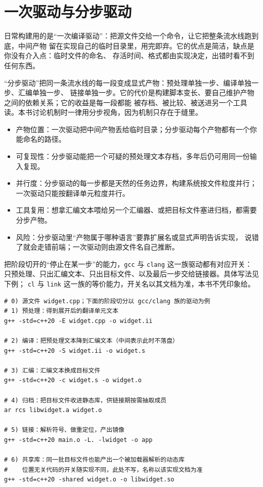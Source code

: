 \documentclass[12pt,a4paper,fontset=fandol]{ctexbook}
\newcommand{\Tool}[1]{\texttt{#1}}
\begin{document}
\section{一次驱动与分步驱动}\label{sec:cl01-drivers}

日常构建用的是“一次编译驱动”：把源文件交给一个命令，让它把整条流水线跑到底，中间产物
留在实现自己的临时目录里，用完即弃。它的优点是简洁，缺点是你没有介入点：临时文件的命名、
存活时间、格式都由实现决定，出错时看不到任何东西。

“分步驱动”把同一条流水线的每一段变成显式产物：预处理单独一步、编译单独一步、汇编单独一步、
链接单独一步。它的代价是构建脚本变长、要自己维护产物之间的依赖关系；它的收益是每一段都能
被存档、被比较、被送进另一个工具读。本书讨论机制时一律用分步视角，因为机制只存在于缝里。

\begin{compare}[title={两种驱动方式的实际差别}]
\begin{itemize}
  \item 产物位置：一次驱动把中间产物丢给临时目录；分步驱动每个产物都有一个你能命名的路径。
  \item 可复现性：分步驱动能把一个可疑的预处理文本存档，多年后仍可用同一份输入复现。
  \item 并行度：分步驱动的每一步都是天然的任务边界，构建系统按文件粒度并行；
    一次驱动只能按翻译单元粒度并行。
  \item 工具复用：想拿汇编文本喂给另一个汇编器、或把目标文件塞进归档，都需要分步产物。
  \item 风险：分步驱动里“产物属于哪种语言”要靠扩展名或显式声明告诉实现，
    说错了就会走错前端；一次驱动则由源文件名自己推断。
\end{itemize}
\end{compare}

把阶段切开的“停止在某一步”的能力，\Tool{gcc} 与 \Tool{clang} 这一族驱动都有对应开关：
只预处理、只出汇编文本、只出目标文件、以及最后一步交给链接器。具体写法见下例；
\Tool{cl} 与 \Tool{link} 这一族的等价能力，开关名以其文档为准，本书不凭印象给。

\begin{lstlisting}[style=shellstyle,language=ShellCL,caption={典型分步流程：每步留一个显式产物（示意）}]
# 0) 源文件 widget.cpp；下面的阶段切分以 gcc/clang 族的驱动为例
# 1) 预处理：得到展开后的翻译单元文本
g++ -std=c++20 -E widget.cpp -o widget.ii

# 2) 编译：把预处理文本降到汇编文本（中间表示此时不落盘）
g++ -std=c++20 -S widget.ii -o widget.s

# 3) 汇编：汇编文本换成目标文件
g++ -std=c++20 -c widget.s -o widget.o

# 4) 归档：把目标文件收进静态库，供链接期按需抽取成员
ar rcs libwidget.a widget.o

# 5) 链接：解析符号、做重定位，产出镜像
g++ -std=c++20 main.o -L. -lwidget -o app

# 6) 共享库：同一批目标文件也能产出一个被加载器解析的动态库
#    位置无关代码的开关随实现不同，此处不写，名称以该实现文档为准
g++ -std=c++20 -shared widget.o -o libwidget.so
\end{lstlisting}
\end{document}
